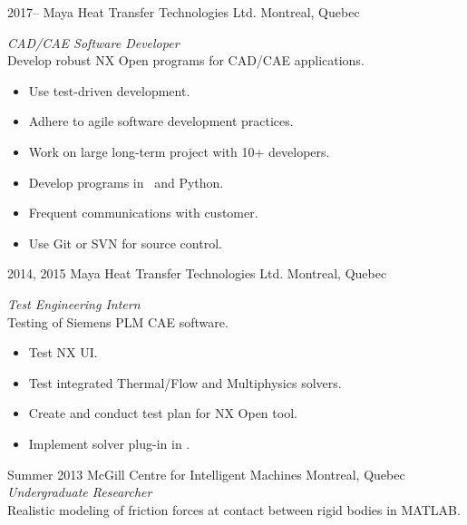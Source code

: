 \begin{entrylist}
\entry
{2017--}
{Maya Heat Transfer Technologies Ltd.}
{Montreal, Quebec}
{\emph{CAD/CAE Software Developer} \\
Develop robust NX Open programs for CAD/CAE applications.
\begin{itemize}
\item Use test-driven development.
\item Adhere to agile software development practices.
\item Work on large long-term project with 10+ developers.
\item Develop programs in \CC~and Python.
\item Frequent communications with customer.
\item Use Git or SVN for source control.
\end{itemize}
}

\entry
{2014, 2015}
{Maya Heat Transfer Technologies Ltd.}
{Montreal, Quebec}
{\emph{Test Engineering Intern} \\
Testing of Siemens PLM CAE software.
\begin{itemize}
\item Test NX UI.
\item Test integrated Thermal/Flow and Multiphysics solvers.
\item Create and conduct test plan for NX Open tool.
\item Implement solver plug-in in \CC.
\end{itemize}
}
\entry
{\small{Summer} 2013}
{McGill Centre for Intelligent Machines}
{Montreal, Quebec}
{\emph{Undergraduate Researcher} \\
Realistic modeling of friction forces at contact between rigid bodies in MATLAB.
}
\end{entrylist}

